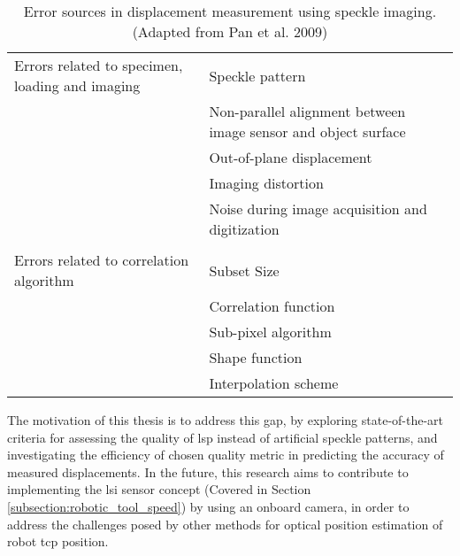         \begin{table}[h]
            \centering
            \footnotesize
            \renewcommand{\arraystretch}{1.2}
            \begin{tabular}{p{7cm}p{7cm}}
                \toprule
                Errors related to specimen, loading and imaging & Speckle pattern \\
                & Non-parallel alignment between image sensor and object surface \\
                & Out-of-plane displacement \\
                & Imaging distortion \\
                & Noise during image acquisition and digitization \\

                \\

                Errors related to correlation algorithm & Subset Size \\
                & Correlation function \\
                & Sub-pixel algorithm \\
                & Shape function \\
                & Interpolation scheme \\
                \bottomrule
            \end{tabular}
            \caption{Error sources in displacement measurement using speckle imaging. \cite{pan_review} (Adapted from Pan et al. 2009)}
            \label{table:error_sources_pan_review}
        \end{table}

        \vspace{5mm}
        \noindent The motivation of this thesis is to address this gap, by exploring state-of-the-art criteria for assessing the quality of \gls{lsp} instead of artificial speckle patterns, and investigating the efficiency of chosen quality metric in predicting the accuracy of measured displacements. In the future, this research aims to contribute to implementing the \gls{lsi} sensor concept (Covered in Section \ref{subsection:robotic_tool_speed}) by using an onboard camera, in order to address the challenges posed by other methods for optical position estimation of robot \gls{tcp} position. 

\clearpage
